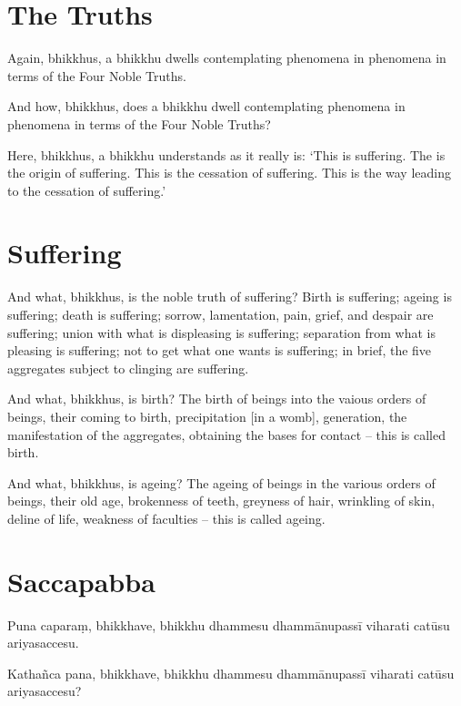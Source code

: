\enlargethispage{\baselineskip}


\englishPage
\section{The Truths}

Again, bhikkhus, a bhikkhu dwells contemplating phenomena in phenomena in terms
of the Four Noble Truths.

And how, bhikkhus, does a bhikkhu dwell contemplating phenomena in phenomena in
terms of the Four Noble Truths?

Here, bhikkhus, a bhikkhu understands as it really is: `This is suffering. The
is the origin of suffering. This is the cessation of suffering. This is the way
leading to the cessation of suffering.'

\section{Suffering}

And what, bhikkhus, is the noble truth of suffering? Birth is suffering; ageing
is suffering; death is suffering; sorrow, lamentation, pain, grief, and despair
are suffering; union with what is displeasing is suffering; separation from what
is pleasing is suffering; not to get what one wants is suffering; in brief, the
five aggregates subject to clinging are suffering.

And what, bhikkhus, is birth? The birth of beings into the vaious orders of
beings, their coming to birth, precipitation [in a womb], generation, the
manifestation of the aggregates, obtaining the bases for contact -- this is
called birth.

And what, bhikkhus, is ageing? The ageing of beings in the various orders of
beings, their old age, brokenness of teeth, greyness of hair, wrinkling of skin,
deline of life, weakness of faculties -- this is called ageing.

\paliPage

\section*{Saccapabba}

Puna caparaṃ, bhikkhave, bhikkhu dhammesu dhammānupassī viharati catūsu
ariyasaccesu.

Kathañca pana, bhikkhave, bhikkhu dhammesu dhammānupassī viharati catūsu
ariyasaccesu?

